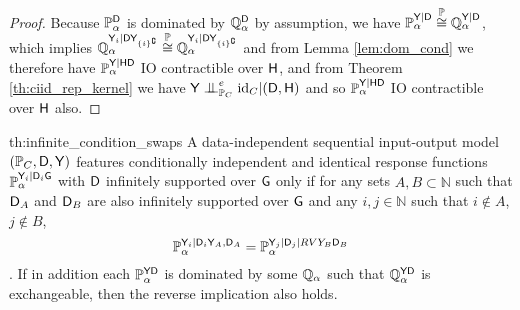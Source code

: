 \begin{proof}
Because $\mathbb{P}_\alpha^{\mathsf{D}}$ is dominated by $\mathbb{Q}_\alpha^{\mathsf{D}}$ by assumption, we have $\mathbb{P}_\alpha^{\mathsf{Y}|\mathsf{D}} \overset{\mathbb{P}}{\cong} \mathbb{Q}_\alpha^{\mathsf{Y}|\mathsf{D}}$, which implies $\mathbb{Q}_\alpha^{\mathsf{Y}_i|\mathsf{D}\mathsf{Y}_{\{i\}^{\complement}}}\overset{\mathbb{P}}{\cong} \mathbb{Q}_\alpha^{\mathsf{Y}_i|\mathsf{D}\mathsf{Y}_{\{i\}^{\complement}}}$ and from Lemma \ref{lem:dom_cond} we therefore have $\mathbb{P}_\alpha^{\mathsf{Y}|\mathsf{HD}}$ IO contractible over $\mathsf{H}$, and from Theorem \ref{th:ciid_rep_kernel} we have $\RV{Y}\CI^e_{\prob{P}_C} \text{id}_C | (\RV{D},\RV{H})$ and so $\mathbb{P}_\alpha^{\mathsf{Y}|\mathsf{HD}}$ IO contractible over $\mathsf{H}$ also.
\end{proof}


\begin{reptheorem}{th:infinite_condition_swaps}
A data-independent sequential input-output model $(\mathbb{P}_C,\mathsf{D},\mathsf{Y})$ features conditionally independent and identical response functions $\mathbb{P}_\alpha^{\mathsf{Y}_i|\mathsf{D}_i\mathsf{G}}$ with $\mathsf{D}$ infinitely supported over $\mathsf{G}$ only if for any sets $A,B\subset \mathbb{N}$ such that $\mathsf{D}_A$ and $\mathsf{D}_B$ are also infinitely supported over $\mathsf{G}$ and any $i,j\in \mathbb{N}$ such that $i\not\in A$, $j\not\in B$, $$\mathbb{P}_\alpha^{\mathsf{Y}_i|\mathsf{D}_i\mathsf{Y}_A,\mathsf{D}_A}=\mathbb{P}_\alpha^{\mathsf{Y}_j|\mathsf{D}_j|RV{Y}_B\mathsf{D}_B}$$.  If in addition each $\mathbb{P}_\alpha^{\mathsf{YD}}$ is dominated by some $\mathbb{Q}_\alpha$ such that $\mathbb{Q}_\alpha^{\mathsf{Y}\mathsf{D}}$ is exchangeable, then the reverse implication also holds.
\end{reptheorem}

